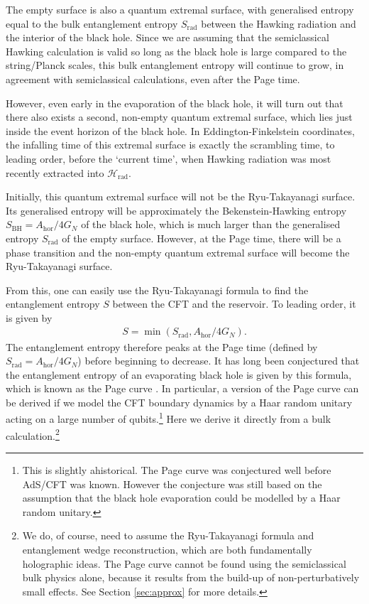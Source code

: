 \documentclass[11pt,a4paper]{article}
\newcommand{\Srad}{S_\text{rad} }
\begin{document}
The empty surface is also a quantum extremal surface, with generalised entropy equal to the bulk entanglement entropy $\Srad$ between the Hawking radiation and the interior of the black hole. Since we are assuming that the semiclassical Hawking calculation is valid so long as the black hole is large compared to the string/Planck scales, this bulk entanglement entropy will continue to grow, in agreement with semiclassical calculations, even after the Page time.

However, even early in the evaporation of the black hole, it will turn out that there also exists a second, non-empty quantum extremal surface, which lies just inside the event horizon of the black hole. In Eddington-Finkelstein coordinates, the infalling time of this extremal surface is exactly the scrambling time, to leading order, before the `current time', when Hawking radiation was most recently extracted into $\mathcal{H}_\text{rad}$.

Initially, this quantum extremal surface will not be the Ryu-Takayanagi surface. Its generalised entropy will be approximately the Bekenstein-Hawking entropy $S_\text{BH} = A_\text{hor} / 4G_N$ of the black hole, which is much larger than the generalised entropy $\Srad$ of the empty surface. However, at the Page time, there will be a phase transition and the non-empty quantum extremal surface will become the Ryu-Takayanagi surface. 

From this, one can easily use the Ryu-Takayanagi formula to find the entanglement entropy $S$ between the CFT and the reservoir. To leading order, it is given by
\begin{align}
S = \min(\Srad, A_\text{hor}/4G_N).
\end{align}
The entanglement entropy therefore peaks at the Page time (defined by $\Srad = A_\text{hor}/4G_N$) before beginning to decrease. It has long been conjectured that the entanglement entropy of an evaporating black hole is given by this formula, which is known as the Page curve \cite{page1993information}. In particular, a version of the Page curve can be derived if we model the CFT boundary dynamics by a Haar random unitary acting on a large number of qubits.\footnote{This is slightly ahistorical. The Page curve was conjectured well before AdS/CFT was known. However the conjecture was still based on the assumption that the black hole evaporation could be modelled by a Haar random unitary.}
Here we derive it directly from a bulk calculation.\footnote{We do, of course, need to assume the Ryu-Takayanagi formula and entanglement wedge reconstruction, which are both fundamentally holographic ideas. The Page curve cannot be found using the semiclassical bulk physics alone, because it results from the build-up of non-perturbatively small effects. See Section \ref{sec:approx} for more details.}
\end{document}
